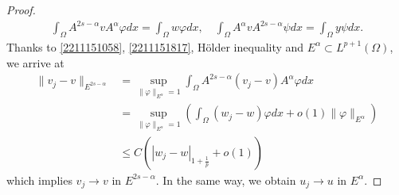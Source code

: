 \documentclass[10pt]{article}
\numberwithin{equation}{section}
\numberwithin{equation}{section}
\begin{document}
\begin{proof}
\begin{equation}
\begin{aligned}
 \int_{\Omega}A^{2s-\alpha}vA^{\alpha}\varphi dx = \int_{\Omega}w \varphi  dx,\quad \int_{\Omega}A^{\alpha}v A^{2s-\alpha}\psi dx  = \int_{\Omega}y \psi dx.
 \end{aligned}
 \end{equation}
Thanks to \eqref{2211151058}, \eqref{2211151817}, H\"older inequality and $E^{\alpha}\subset L^{p+1}(\Omega)$, we arrive at
 \[
 \begin{aligned}
 \|v_j-v\|_{E^{2s-\alpha}}&=\underset{\|\varphi\|_{E^{\alpha}}=1}{\sup}\int_{\Omega}A^{2s-\alpha}(v_j-v)A^{\alpha}\varphi dx \\
 &= \underset{\|\varphi\|_{E^{\alpha}}=1}{\sup}\left(\int_{\Omega}(w_j-w) \varphi  dx+o(1)\|\varphi\|_{E^\alpha}\right)\\
 &\le C\left(|w_j-w|_{1+\frac1p}+o(1)\right)
 \end{aligned}
 \]
which implies $v_j\to v$ in $E^{2s-\alpha}$. In the same way, we obtain $u_j\to u$ in $E^{\alpha}$.
\end{proof}
\end{document}
